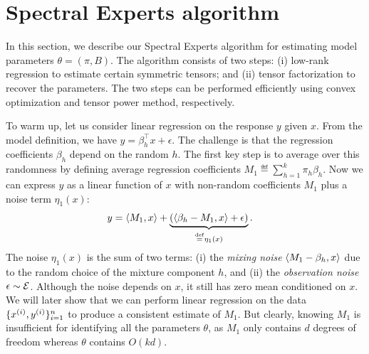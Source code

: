 \section{Spectral Experts algorithm}
\label{sec:algo}

In this section, we describe our Spectral Experts algorithm
for estimating model parameters $\theta = (\pi, B)$.
The algorithm consists of two steps:
(i) low-rank regression to estimate certain symmetric tensors;
and (ii) tensor factorization to recover the parameters.
The two steps can be performed efficiently using
convex optimization and tensor power method, respectively.

To warm up, let us consider linear regression
on the response $y$ given $x$.
From the model definition, we have $y = \beta_h^\top x + \epsilon$.
The challenge is that the regression coefficients $\beta_h$ depend on the random $h$.
The first key step is to average over this randomness by defining
average regression coefficients
$M_1 \eqdef \sum_{h=1}^k \pi_h \beta_h$.
Now we can express $y$ as a linear function of $x$ with non-random coefficients $M_1$
plus a noise term $\eta_1(x)$:
\begin{align}
  y &= \langle M_1, x \rangle +
  \underbrace{(\langle \beta_h - M_1, x \rangle + \epsilon)}_{\stackrel{\rm def}{=} \eta_1(x)}. \label{eqn:y1}
\end{align}
The noise $\eta_1(x)$ is the sum of two terms:
(i) the \emph{mixing noise} $\langle M_1 - \beta_h, x \rangle$
due to the random choice of the mixture component $h$,
and (ii) the \emph{observation noise} $\epsilon \sim \mathcal{E}$.
Although the noise depends on $x$,
it still has zero mean conditioned on $x$.
We will later show that we can
perform linear regression on the data $\{x^{(i)},
y^{(i)}\}_{i=1}^{n}$ to produce a consistent estimate of $M_1$.
But clearly, knowing $M_1$ is insufficient
for identifying all the parameters $\theta$,
as
$M_1$ only contains $d$ degrees of freedom whereas $\theta$ contains $O(kd)$.

